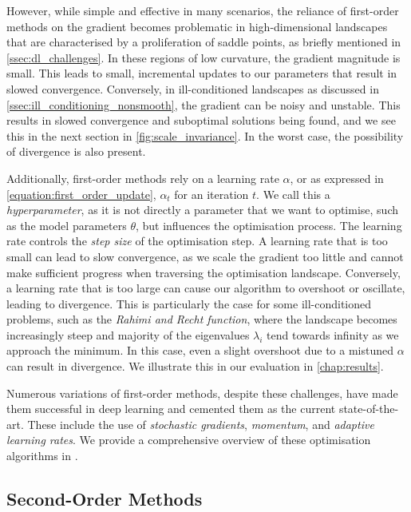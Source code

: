 However, while simple and effective in many scenarios, the reliance of first-order methods on the gradient becomes problematic in high-dimensional landscapes that are characterised by a proliferation of saddle points, as briefly mentioned in \cref{ssec:dl_challenges}. In these regions of low curvature, the gradient magnitude is small. This leads to small, incremental updates to our parameters that result in slowed convergence. Conversely, in ill-conditioned landscapes as discussed in \cref{ssec:ill_conditioning_nonsmooth}, the gradient can be noisy and unstable. This results in slowed convergence and suboptimal solutions being found, and we see this in the next section in \cref{fig:scale_invariance}. In the worst case, the possibility of divergence is also present. 

Additionally, first-order methods rely on a learning rate $\alpha$, or as expressed in \cref{equation:first_order_update}, $\alpha_t$ for an iteration $t$. We call this a \textit{hyperparameter}, as it is not directly a parameter that we want to optimise, such as the model parameters $\theta$, but influences the optimisation process. The learning rate controls the \textit{step size} of the optimisation step. A learning rate that is too small can lead to slow convergence, as we scale the gradient too little and cannot make sufficient progress when traversing the optimisation landscape. Conversely, a learning rate that is too large can cause our algorithm to overshoot or oscillate, leading to divergence. This is particularly the case for some ill-conditioned problems, such as the \textit{Rahimi and Recht function}, where the landscape becomes increasingly steep and majority of the eigenvalues $\lambda_i$ tend towards infinity as we approach the minimum. In this case, even a slight overshoot due to a mistuned $\alpha$ can result in divergence. We illustrate this in our evaluation in \cref{chap:results}. 

Numerous variations of first-order methods, despite these challenges, have made them successful in deep learning and cemented them as the current state-of-the-art. These include the use of \textit{stochastic gradients}, \textit{momentum}, and \textit{adaptive learning rates}. We provide a comprehensive overview of these optimisation algorithms in .

\subsection{Second-Order Methods}
\label{ssec:second_order_methods}

